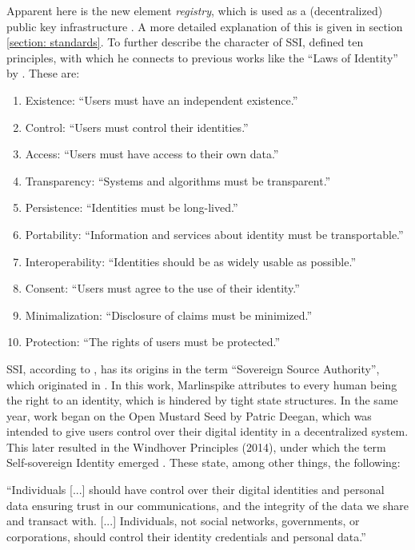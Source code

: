         Apparent here is the new element \textit{registry}, which is used as a (decentralized) public key infrastructure \cite[p. 89]{preukschat_self-sovereign_2021}. A more detailed explanation of this is given in section \ref{section: standards}. To further describe the character of \ac{SSI}, \cite{allen_path_2016} defined ten principles, with which he connects to previous works like the “Laws of Identity” by \cite{cameron_laws_2005}. These are:
        
        \begin{enumerate}
        	\item Existence: “Users must have an independent existence.”
        	\item Control: “Users must control their identities.”
        	\item Access: “Users must have access to their own data.”
        	\item Transparency: “Systems and algorithms must be transparent.”
        	\item Persistence: “Identities must be long-lived.”
        	\item Portability: “Information and services about identity must be transportable.”
        	\item Interoperability: “Identities should be as widely usable as possible.”
        	\item Consent: “Users must agree to the use of their identity.”
        	\item Minimalization: “Disclosure of claims must be minimized.”
        	\item Protection: “The rights of users must be protected.”
        \end{enumerate}
	    
	    SSI, according to \cite{allen_path_2016}, has its origins in the term “Sovereign Source Authority”, which originated in \cite{marlinspike_what_2012}. In this work, Marlinspike attributes to every human being the right to an identity, which is hindered by tight state structures. In the same year, work began on the Open Mustard Seed by Patric Deegan, which was intended to give users control over their digital identity in a decentralized system. This later resulted in the Windhover Principles (2014), under which the term Self-sovereign Identity emerged \cite{idcubedorg_windhover_2014, hub_culture_hubid_2014}. These state, among other things, the following: \cite{allen_path_2016}
	    
	    \begin{displayquote}
            “Individuals [...] should have control over their digital identities and personal data ensuring trust in our communications, and the integrity of the data we share and transact with. [...] Individuals, not social networks, governments, or corporations, should control their identity credentials and personal data.”
        \end{displayquote}
        
